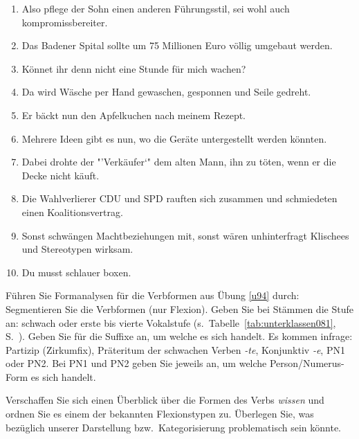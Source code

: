 \begin{sloppypar}
\begin{enumerate}
  \item Also pflege der Sohn einen anderen Führungsstil, sei wohl auch kompromissbereiter.
  \item Das Badener Spital sollte um 75 Millionen Euro völlig umgebaut werden.
  \item Könnet ihr denn nicht eine Stunde für mich wachen?
  \item Da wird Wäsche per Hand gewaschen, gesponnen und Seile gedreht.
  \item Er bäckt nun den Apfelkuchen nach meinem Rezept.
  \item Mehrere Ideen gibt es nun, wo die Geräte untergestellt werden könnten.
  \item Dabei drohte der "'Verkäufer`" dem alten Mann, ihn zu töten, wenn er die Decke nicht käuft.
  \item Die Wahlverlierer CDU und SPD rauften sich zusammen und schmiedeten einen Koalitionsvertrag.
  \item Sonst schwängen Machtbeziehungen mit, sonst wären unhinterfragt Klischees und Stereotypen wirksam.
  \item Du musst schlauer boxen.
\end{enumerate}

\Uebung \label{u95} Führen Sie Formanalysen für die Verbformen aus Übung \ref{u94} durch:
Segmentieren Sie die Verbformen (nur Flexion).
Geben Sie bei Stämmen die Stufe an: schwach oder erste bis vierte Vokalstufe (s.\ Tabelle~\ref{tab:unterklassen081}, S.~\pageref{tab:unterklassen081}).
Geben Sie für die Suffixe an, um welche es sich handelt.
Es kommen infrage: Partizip (Zirkumfix), Präteritum der schwachen Verben \textit{-te}, Konjunktiv \textit{-e}, PN1 oder PN2.
Bei PN1 und PN2 geben Sie jeweils an, um welche Person/Numerus-Form es sich handelt.

\Uebung[\tristar] \label{u96} Verschaffen Sie sich einen Überblick über die Formen des Verbs \textit{wissen} und ordnen Sie es einem der bekannten Flexionstypen zu.
Überlegen Sie, was bezüglich unserer Darstellung bzw.\ Kategorisierung problematisch sein könnte.

\end{sloppypar}

